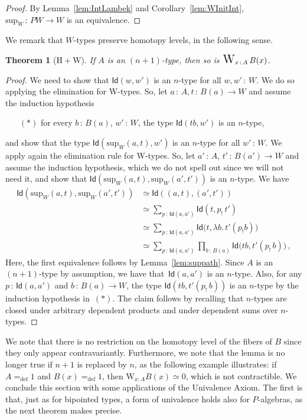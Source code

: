 \documentclass[10pt,a4paper,oneside,reqno]{amsart}
\theoremstyle{mythm}
\newtheorem{theorem}{Theorem}[section]
\theoremstyle{mydef}
\theoremstyle{myrmk}
\newcommand{\defeq}{=_{\mathrm{def}}}
\newcommand{\co}{\,{:}\,}
\newcommand{\Hint}{\mathrm{H}}
\newcommand{\Id}{\mathsf{Id}}
\newcommand{\W}{\mathrm{W}}
\DeclareMathOperator*{\WW}{\text{\Large $\mathrm{W}$}}
\renewcommand{\sup}{\mathrm{sup}}
\begin{document}
\begin{proof}
By Lemma~\ref{lem:IntLambek} and Corollary~\ref{lem:WInitInt}, $\sup_W \co PW \to W$ is an equivalence.
\end{proof}





We  remark that $W$-types  preserve homotopy levels, in the following sense.

\begin{theorem}[$\Hint + \W$]
If $A$ is an $(n+1)$-type, then so is $\WW_{x \co A} B(x)$.
\end{theorem}


\begin{proof}
We need to show that $\Id(w, w')$ is an $n$-type for all $w, w' \co W$. We do so applying the elimination for W-types.
So, let $a \co A, t \co B(a) \to W$ and assume the induction hypothesis 
\begin{itemize}
\item[$(\ast)$] for every $b \co B(a)$, $w' \co W$, the type $\Id(tb,w')$ is an $n$-type, 
\end{itemize}
and show that  the type $\Id(\sup_W(a,t), w')$ is an $n$-type for all $w' \co W$. We apply again the elimination rule for W-types. So, let   $a' \co A$, $t' \co B(a') \to W$ and assume the induction hypothesis, which we do not spell out since we will not need it, and show that $\Id( \sup_W(a,t) , \sup_W(a',t'))$ is an $n$-type. We have
\begin{align*} 
\Id(\sup_W(a,t), \sup_W(a',t'))
& \simeq \Id((a,t) , (a',t')) \\
& \simeq \sum_{p \co \Id(a, a')} \Id( t , p_{!} \, t' )   \\
& \simeq \sum_{p \co \Id(a,a')}  \Id\big(t, \lambda b. \,  t'( p_{!} b)\big) \\
& \simeq \sum_{p \co \Id(a,a')} \prod_{b \co B(a)} \Id \big( tb , t'(p_{!} \, b)\big) \, , 
\end{align*}
Here, the first equivalence follows by Lemma~\ref{lem:suppath}. Since $A$ is an $(n+1)$-type by assumption, we have 
that~$\Id(a,a')$ is an $n$-type. Also, for any $p \co \Id(a,a')$ and $b \co B(a) \to W$, the type $\Id(tb,  t'(p_{!} \, b))$ is an $n$-type by the 
induction 
hypothesis in~$(\ast)$. The claim follows by recalling that $n$-types are closed under arbitrary dependent products and under dependent 
sums over $n$-types. 
\end{proof}

We note that there is no restriction on the homotopy level of the fibers of $B$ since they only appear contravariantly. Furthermore, we note that the lemma is no longer true if $n+1$ is replaced by $n$, as the following example
illustrates: if $A \defeq 1$ and $B(x) \defeq 1$, then $\W_{x:A} B(x) \simeq 0$, which is not contractible. 
We conclude this section with some applications of the Univalence Axiom. The first is that, just as for bipointed 
types, a form of univalence holds also for $P$-algebras, as the next theorem makes precise. 
\end{document}
